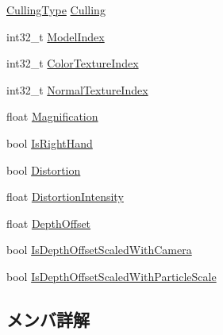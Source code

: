 \begin{DoxyCompactItemize}
\item 
\mbox{\hyperlink{namespace_effekseer_a3ae9542a9c9309ec191be1ae5e6dc00a}{Culling\+Type}} \mbox{\hyperlink{struct_effekseer_1_1_model_renderer_1_1_node_parameter_a8ead63177a2cb7f0797f646e682db538}{Culling}}
\item 
int32\+\_\+t \mbox{\hyperlink{struct_effekseer_1_1_model_renderer_1_1_node_parameter_a8d90f2d66294e2005cc737afbfa97dea}{Model\+Index}}
\item 
int32\+\_\+t \mbox{\hyperlink{struct_effekseer_1_1_model_renderer_1_1_node_parameter_abdfcf0e63df9aff535effe2eaedfbdd3}{Color\+Texture\+Index}}
\item 
int32\+\_\+t \mbox{\hyperlink{struct_effekseer_1_1_model_renderer_1_1_node_parameter_abad17228020f70a3f2ac1d05c25f73ac}{Normal\+Texture\+Index}}
\item 
float \mbox{\hyperlink{struct_effekseer_1_1_model_renderer_1_1_node_parameter_a2795f9c10fd867586eaf942ddb772364}{Magnification}}
\item 
bool \mbox{\hyperlink{struct_effekseer_1_1_model_renderer_1_1_node_parameter_aa6a88952b1eb5e94d718a8523a1082fc}{Is\+Right\+Hand}}
\item 
bool \mbox{\hyperlink{struct_effekseer_1_1_model_renderer_1_1_node_parameter_adb4920c1697cfdee2cd7fff84a7ebc11}{Distortion}}
\item 
float \mbox{\hyperlink{struct_effekseer_1_1_model_renderer_1_1_node_parameter_aebe9d866f67f827bcd6fcba2721f57ac}{Distortion\+Intensity}}
\item 
float \mbox{\hyperlink{struct_effekseer_1_1_model_renderer_1_1_node_parameter_a53b8a8653231f5f9a7d4721e76f78f36}{Depth\+Offset}}
\item 
bool \mbox{\hyperlink{struct_effekseer_1_1_model_renderer_1_1_node_parameter_a58602ab7f71d1a8ead8a7e9b0168b5e7}{Is\+Depth\+Offset\+Scaled\+With\+Camera}}
\item 
bool \mbox{\hyperlink{struct_effekseer_1_1_model_renderer_1_1_node_parameter_a4826b66cd9c8841881d1e405b4d9ef16}{Is\+Depth\+Offset\+Scaled\+With\+Particle\+Scale}}
\end{DoxyCompactItemize}


\subsection{メンバ詳解}
\mbox{\label{struct_effekseer_1_1_model_renderer_1_1_node_parameter_a412adbcede66578e67fc52338df61843}} 
